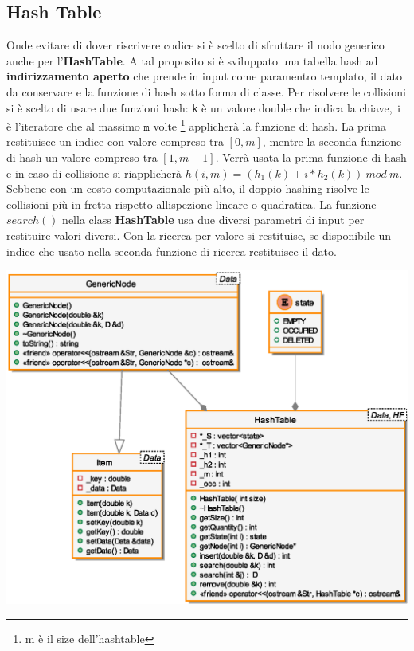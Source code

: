 \subsection{Hash Table}
Onde evitare di dover riscrivere codice si \`e scelto di sfruttare
il nodo generico anche per l'\textbf{HashTable}. A tal proposito
si \`e sviluppato una tabella hash ad \textbf{indirizzamento aperto} che
prende in input come paramentro templato, il dato da conservare e 
la funzione di hash sotto forma di classe.
Per risolvere le collisioni si \`e scelto di usare due funzioni hash:
\texttt{k} \`e un valore double che indica
la chiave, $\texttt{i}$ \`e l'iteratore che al massimo 
$\texttt{m}$ volte \footnote{m \`e il size dell'hashtable}  
applicher\`a la funzione di hash. La prima restituisce un indice con valore compreso
tra $[0, m]$, mentre la seconda funzione di hash un valore compreso tra $[1, m-1]$. 
Verr\`a usata la prima funzione di hash e in caso di collisione
si riapplicher\`a
$h(i, m) = (h_1(k) + i * h_2(k)) \ mod \ m$. Sebbene con un costo 
computazionale pi\`u alto, il doppio hashing risolve le collisioni
pi\`u in fretta rispetto allispezione lineare o quadratica.\newline \indent 
La funzione $search()$ nella class \textbf{HashTable} usa due
diversi parametri di input per restituire valori diversi. Con la 
ricerca per valore si restituise, se disponibile un indice che 
usato nella seconda funzione di ricerca restituisce il dato.

\begin{center}
\includegraphics[scale=0.6]{tesina_tex/rbhash/2img/hash.eps}
\end{center}